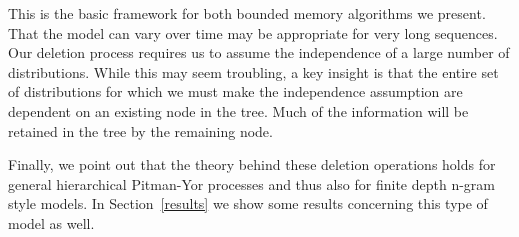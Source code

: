 This is the basic framework for both bounded memory algorithms we present.  That the model can vary over time may be appropriate for very long sequences. Our deletion process requires us to assume the independence of a large number of distributions.  While this may seem troubling, a key insight is that the entire set of distributions for which we must make the independence assumption are dependent on an existing node in the tree.  Much of the information will be retained in the tree by the remaining node.

Finally, we point out that the theory behind these deletion operations holds for general hierarchical Pitman-Yor processes and thus also for finite depth n-gram style models.  In Section~\ref{results} we show some results concerning this type of model as well.
